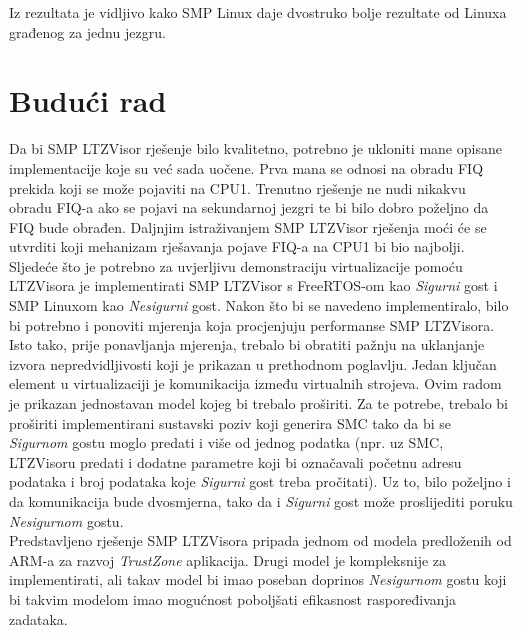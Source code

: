 \documentclass[times, utf8, diplomski, numeric]{fer}
\begin{document}
Iz rezultata je vidljivo kako SMP Linux daje dvostruko bolje rezultate od Linuxa građenog za jednu jezgru.

\chapter{Budući rad}
Da bi SMP LTZVisor rješenje bilo kvalitetno, potrebno je ukloniti mane opisane implementacije koje su već sada uočene.
Prva mana se odnosi na obradu FIQ prekida koji se može pojaviti na CPU1. Trenutno rješenje ne nudi nikakvu obradu FIQ-a
ako se pojavi na sekundarnoj jezgri te bi bilo dobro poželjno da FIQ bude obrađen. Daljnjim istraživanjem SMP LTZVisor
rješenja moći će se utvrditi koji mehanizam rješavanja pojave FIQ-a na CPU1 bi bio najbolji. Sljedeće što je potrebno
za uvjerljivu demonstraciju virtualizacije pomoću LTZVisora je implementirati SMP LTZVisor s FreeRTOS-om kao
\textit{Sigurni} gost i SMP Linuxom kao \textit{Nesigurni} gost. Nakon što bi se navedeno implementiralo, bilo bi
potrebno i ponoviti mjerenja koja procjenjuju performanse SMP LTZVisora. Isto tako, prije ponavljanja mjerenja, trebalo
bi obratiti pažnju na uklanjanje izvora nepredvidljivosti koji je prikazan u prethodnom poglavlju. Jedan ključan element
u virtualizaciji je komunikacija između virtualnih strojeva. Ovim radom je prikazan jednostavan model kojeg bi trebalo
proširiti. Za te potrebe, trebalo bi proširiti implementirani sustavski poziv koji generira SMC tako da bi se
\textit{Sigurnom} gostu moglo predati i više od jednog podatka (npr. uz SMC, LTZVisoru predati i dodatne parametre koji
bi označavali početnu adresu podataka i broj podataka koje \textit{Sigurni} gost treba pročitati). Uz to, bilo poželjno
i da komunikacija bude dvosmjerna, tako da i \textit{Sigurni} gost može proslijediti poruku \textit{Nesigurnom} gostu.\\
Predstavljeno rješenje SMP LTZVisora pripada jednom od modela predloženih od ARM-a za razvoj \textit{TrustZone} aplikacija.
Drugi model je kompleksnije za implementirati, ali takav model bi imao poseban doprinos \textit{Nesigurnom} gostu koji
bi takvim modelom imao mogućnost poboljšati efikasnost raspoređivanja zadataka.
\end{document}
